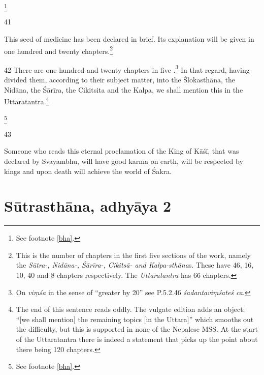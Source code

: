 \documentclass[12pt]{article}
\let\se\saneng  %
\begin{document}
\begin{translation}
\begin{itemize}
\end{itemize}
\footnote{See footnote \ref{bha}.}

\item[41]
 
\begin{sloka}
This seed of medicine has been declared in brief.  Its explanation will be given in one 
hundred and twenty chapters.\footnote{This is the number of chapters in the first 
five sections of the work, namely the  \emph{Sūtra-, Nidāna-, Śārīra-, Cikitsā- 
\emph{and} 
Kalpa-sthāna}s. These have 46, 16, 10, 40 and 8 chapters respectively.  The 
\emph{Uttaratantra} has 66 chapters.}
\end{sloka}


\item [42] There are one hundred and twenty chapters in five
\se{adhyāya}{sections}.\footnote{On \emph{viṃśa} in the sense of “greater by 20”
see P.5.2.46 \emph{śadantaviṃśateś ca}.}  In that regard, having divided them,
according to their subject matter, into the Ślokasthāna, the Nidāna, the Śārīra,
the Cikitsita and the Kalpa, we shall mention this in the
Uttaratantra.\footnote{The end of this sentence reads oddly.  The vulgate edition
adds an object: “[we shall mention] the remaining topics [in the Uttara]” which
smooths out the difficulty, but this is supported in none of the Nepalese MSS.  At
the start of the Uttaratantra \citep[1.3--4ab]{susr-trikamji3} there is indeed a
statement that picks up the point about there being 120 chapters.}

\footnote{See footnote \ref{bha}.}

\item[43]    
    \begin{sloka}
        Someone who reads this eternal proclamation of the King of
Kāśī, that was declared by Svayambhu, will have good karma on earth, will
be respected by kings and upon death will achieve the world of Śakra.
    \end{sloka}
    
\end{translation}    
    
    \newpage
    
     \section{Sūtrasthāna, adhyāya 2}
  
\end{document}
